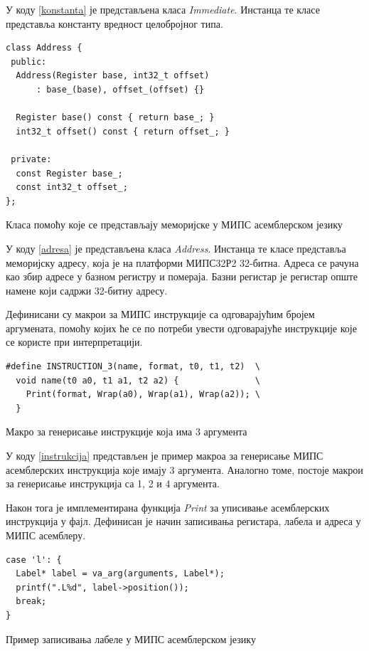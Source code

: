 \documentclass[12pt,oneside]{memoir}
\begin{document}
У коду \ref{konstanta} је представљена класа \textit{Immediate}. Инстанца те класе представља константу вредност целобројног типа.\\

\begin{listing}
\begin{verbatim}
class Address {
 public:
  Address(Register base, int32_t offset)
      : base_(base), offset_(offset) {}

  Register base() const { return base_; }
  int32_t offset() const { return offset_; }

 private:
  const Register base_;
  const int32_t offset_;
};
\end{verbatim}
\caption{Класа помоћу које се представљају меморијске у МИПС асемблерском језику}
\label{adresa}
\end{listing}

У коду \ref{adresa} је представљена класа \textit{Address}. Инстанца те класе представља меморијску адресу, која је на платформи МИПС32Р2 32-битна. Адреса се рачуна као збир адресе у базном регистру и помераја. Базни регистар је регистар опште намене који садржи 32-битну адресу. 

Дефинисани су макрои за МИПС инструкције са одговарајућим бројем аргумената, помоћу којих ће се по потреби увести одговарајуће инструкције које се користе при интерпретацији.\\

\begin{listing}
\begin{verbatim}
#define INSTRUCTION_3(name, format, t0, t1, t2)  \
  void name(t0 a0, t1 a1, t2 a2) {               \
    Print(format, Wrap(a0), Wrap(a1), Wrap(a2)); \
  }
\end{verbatim}
\caption{Макро за генерисање инструкције која има 3 аргумента}
\label{instrukcija}
\end{listing}

У коду \ref{instrukcija} представљен је пример макроа за генерисање МИПС асемблерских инструкција које имају 3 аргумента. Аналогно томе, постоје макрои за генерисање инструкција са 1, 2 и 4 аргумента.

Након тога је имплементирана функција \textit{Print} за уписивање асемблерских инструкција у фајл. Дефинисан је начин записивања регистара, лабела и адреса у МИПС асемблеру.\\

\begin{listing}
\begin{verbatim}
case 'l': {
  Label* label = va_arg(arguments, Label*);
  printf(".L%d", label->position());
  break;
}
\end{verbatim}
\caption{Пример записивања лабеле у МИПС асемблерском језику}
\label{print_labela}
\end{listing}
\end{document}

